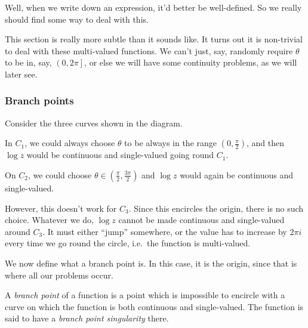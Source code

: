 \documentclass[a4paper]{article}
\begin{document}
Well, when we write down an expression, it'd better be well-defined. So we really should find some way to deal with this.

This section is really more subtle than it sounds like. It turns out it is non-trivial to deal with these multi-valued functions. We can't just, say, randomly require $\theta$ to be in, say, $\left(0, 2\pi\right]$, or else we will have some continuity problems, as we will later see.

\subsubsection*{Branch points}
Consider the three curves shown in the diagram.
\begin{center}
\end{center}
In $C_1$, we could always choose $\theta$ to be always in the range $\left(0, \frac{\pi}{2}\right)$, and then $\log z$ would be continuous and single-valued going round $C_1$.

On $C_2$, we could choose $\theta \in \left(\frac{\pi}{2}, \frac{3\pi}{2}\right)$ and $\log z$ would again be continuous and single-valued.

However, this doesn't work for $C_3$. Since this encircles the origin, there is no such choice. Whatever we do, $\log z$ cannot be made continuous and single-valued around $C_3$. It must either ``jump'' somewhere, or the value has to increase by $2\pi i$ every time we go round the circle, i.e.\ the function is multi-valued.

We now define what a branch point is. In this case, it is the origin, since that is where all our problems occur.
\begin{defi}
  A \emph{branch point} of a function is a point which is impossible to encircle with a curve on which the function is both continuous and single-valued. The function is said to have a \emph{branch point singularity} there.
\end{defi}
\end{document}
